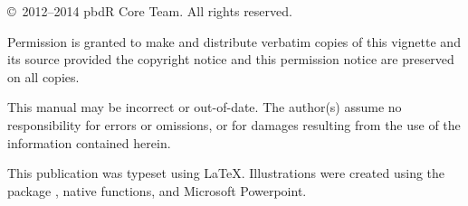 \null
\vfill

\copyright\ 2012--2014 pbdR Core Team.  All rights reserved.

Permission is granted to make and distribute verbatim copies of this vignette
and its source provided the copyright notice and this permission notice are
preserved on all copies.

This manual may be incorrect or out-of-date.  The author(s) assume
no responsibility for errors or omissions, or for damages resulting
from the use of the information contained herein.

This publication was typeset using \LaTeX. Illustrations were created
using the  package \citep{ggplot2}, native  functions,
and Microsoft Powerpoint.
